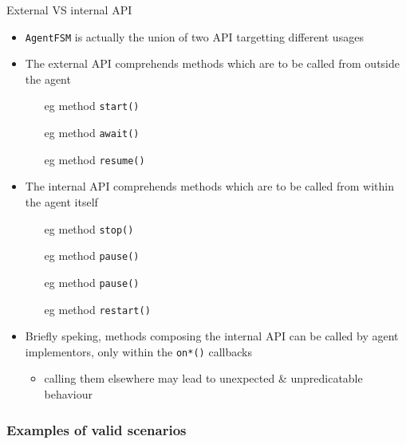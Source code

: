 \documentclass[presentation]{beamer}\mode<presentation>{\usetheme{AMSCesenaPurpleAndGold}}
\begin{document}
\begin{frame}{External VS internal API}

\begin{itemize}
    \item \texttt{AgentFSM} is actually the union of two API targetting different usages

    \vfill

    \item The \alert{external} API comprehends methods which are to be called \alert{from outside} the agent
    \begin{itemize}
        \item[eg] method \texttt{\alert{start()}}
        \item[eg] method \texttt{\alert{await()}}
        \item[eg] method \texttt{\alert{resume()}}
    \end{itemize}

    \vfill

    \item The \alert{internal} API comprehends methods which are to be called \alert{from within} the agent itself
    \begin{itemize}
        \item[eg] method \texttt{\alert{stop()}}
        \item[eg] method \texttt{\alert{pause()}}
        \item[eg] method \texttt{\alert{pause()}}
        \item[eg] method \texttt{\alert{restart()}}
    \end{itemize}

    \vfill

    \item Briefly speking, methods composing the \alert{internal} API can be called by agent implementors, \alert{only} within the \texttt{on*()} callbacks
    \begin{itemize}
        \item calling them elsewhere may lead to unexpected \& unpredicatable behaviour
    \end{itemize}
\end{itemize}

\end{frame}

\subsubsection{Examples of valid scenarios}
\end{document}
